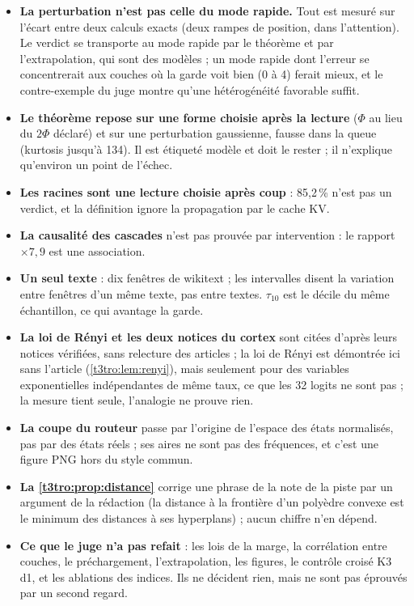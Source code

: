\begin{faux}
\begin{itemize}
\item \textbf{La perturbation n'est pas celle du mode rapide.} Tout est mesuré sur l'écart entre deux calculs exacts (deux rampes de position, dans l'attention). Le verdict se transporte au mode rapide par le théorème et par l'extrapolation, qui sont des modèles ; un mode rapide dont l'erreur se concentrerait aux couches où la garde voit bien (0 à 4) ferait mieux, et le contre-exemple du juge montre qu'une hétérogénéité favorable suffit.
\item \textbf{Le théorème repose sur une forme choisie après la lecture} ($\Phi$ au lieu du $2\Phi$ déclaré) et sur une perturbation gaussienne, fausse dans la queue (kurtosis jusqu'à 134). Il est étiqueté modèle et doit le rester ; il n'explique qu'environ un point de l'échec.
\item \textbf{Les racines sont une lecture choisie après coup} : 85,2\,\% n'est pas un verdict, et la définition ignore la propagation par le cache KV.
\item \textbf{La causalité des cascades} n'est pas prouvée par intervention : le rapport $\times 7{,}9$ est une association.
\item \textbf{Un seul texte} : dix fenêtres de wikitext ; les intervalles disent la variation entre fenêtres d'un même texte, pas entre textes. $\tau_{10}$ est le décile du même échantillon, ce qui avantage la garde.
\item \textbf{La loi de Rényi et les deux notices du cortex} sont citées d'après leurs notices vérifiées, sans relecture des articles ; la loi de Rényi est démontrée ici sans l'article (\cref{t3tro:lem:renyi}), mais seulement pour des variables exponentielles indépendantes de même taux, ce que les 32 logits ne sont pas ; la mesure tient seule, l'analogie ne prouve rien.
\item \textbf{La coupe du routeur} passe par l'origine de l'espace des états normalisés, pas par des états réels ; ses aires ne sont pas des fréquences, et c'est une figure PNG hors du style commun.
\item \textbf{La \cref{t3tro:prop:distance}} corrige une phrase de la note de la piste par un argument de la rédaction (la distance à la frontière d'un polyèdre convexe est le minimum des distances à ses hyperplans) ; aucun chiffre n'en dépend.
\item \textbf{Ce que le juge n'a pas refait} : les lois de la marge, la corrélation entre couches, le préchargement, l'extrapolation, les figures, le contrôle croisé K3 d1, et les ablations des indices. Ils ne décident rien, mais ne sont pas éprouvés par un second regard.
\end{itemize}
\end{faux}

